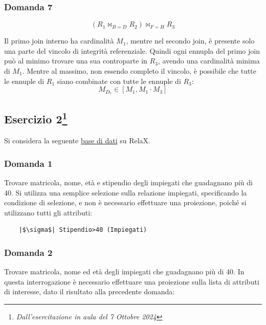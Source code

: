\documentclass{article}
\begin{document}
\subsubsection*{Domanda 7}

\begin{equation*}
    (R_1\Join_{B=D}R_2)\Join_{F=H}R_3
\end{equation*}

Il primo join interno ha cardinalità $M_1$, mentre nel secondo join, è presente solo una parte del vincolo di integrità referenziale. Quindi ogni ennupla del primo join può al minimo 
trovare una sua controparte in $R_3$, avendo una cardinalità minima di $M_1$. Mentre al massimo, non essendo completo il vincolo, è possibile che tutte le ennuple di $R_1$ siano combinate 
con tutte le ennuple di $R_3$:
\begin{equation}
    M_{D_7}\in[M_1,M_1\cdot M_3]
\end{equation}

\subsection{Esercizio 2\footnote{\textit{Dall'esercitazione in aula del 7 Ottobre 2024}}}

Si considera la seguente \href{https://dbis-uibk.github.io/relax/calc/gist/b7a8eac38317e0d6a7f0b904a9a10bd3}{base di dati} su RelaX.


\subsubsection*{Domanda 1}

Trovare matricola, nome, età e stipendio degli impiegati che guadagnano più di 40. Si utilizza una semplice selezione sulla relazione impiegati, specificando la condizione di selezione, e non è necessario 
effettuare una proiezione, poiché si utilizzano tutti gli attributi: 

\begin{verbatim}
    |$\sigma$| Stipendio>40 (Impiegati)
\end{verbatim}

\subsubsection*{Domanda 2}

Trovare matricola, nome ed età degli impiegati che guadagnano più di 40. In questa interrogazione è necessario effettuare una proiezione sulla lista di attributi di interesse, dato il risultato alla precedente 
domanda:
\end{document}
